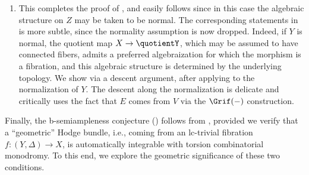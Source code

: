 \documentclass{amsart}
\theoremstyle{definition}
\theoremstyle{remark}
\numberwithin{equation}{section}
\begin{document}
\begin{enumerate}[itemsep=.5em]
\item\label{step:finish}  This completes the proof of , and  easily follows since in this case the algebraic structure on $Z$ may be taken to be normal. The corresponding statements in  is more subtle, since the normality assumption is now dropped. Indeed, if $Y$ is normal, the quotient map $X\to \quotientY$, which may be assumed to have connected fibers, admits a preferred algebraization for which the morphism is a fibration, and this algebraic structure is determined by the underlying topology. We show  via a descent argument, after applying  to the normalization of $Y$. The descent along the normalization is delicate and critically uses the fact that $E$ comes from $V$ via the $\Grif(-)$ construction.   



\end{enumerate}




Finally, the  b-semiampleness conjecture () follows from ,
provided we verify that a ``geometric'' Hodge bundle, i.e., coming from an lc-trivial fibration $f \colon (Y, \Delta) \to X$, is automatically integrable with torsion combinatorial monodromy. To this end, we explore the geometric significance of these two conditions.
\end{document}
